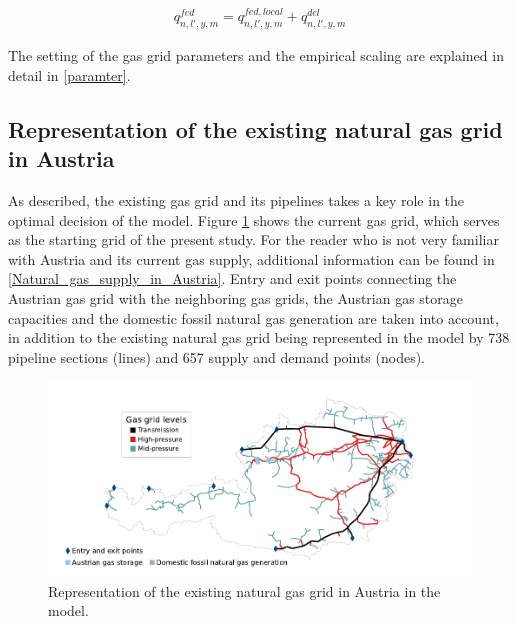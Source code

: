 \begin{align}\label{gas_balance_source}
	q^{fed}_{n,l',y,m} = q^{fed,local}_{n,l',y,m} + q^{del}_{n,l',y,m}
\end{align}

The setting of the gas grid parameters and the empirical scaling are explained in detail in \ref{paramter}. 

\subsection{Representation of the existing natural gas grid in Austria}\label{gas_grid_austria}
As described, the existing gas grid and its pipelines takes a key role in the optimal decision of the model. Figure \ref{method:existing_gas_grid} shows the current gas grid, which serves as the starting grid of the present study. For the reader who is not very familiar with Austria and its current gas supply, additional information can be found in \ref{Natural_gas_supply_in_Austria}. Entry and exit points connecting the Austrian gas grid with the neighboring gas grids, the Austrian gas storage capacities and the domestic fossil natural gas generation are taken into account, in addition to the existing natural gas grid being represented in the model by 738 pipeline sections (lines) and 657 supply and demand points (nodes).

\begin{figure}[h]
	\centering
	\includegraphics[width=1\linewidth]{figures/method/existing_gas_grid/2023_existing_natural_gas_grid.pdf}
	\caption{Representation of the existing natural gas grid in Austria in the model.}
	\label{method:existing_gas_grid}
\end{figure}

